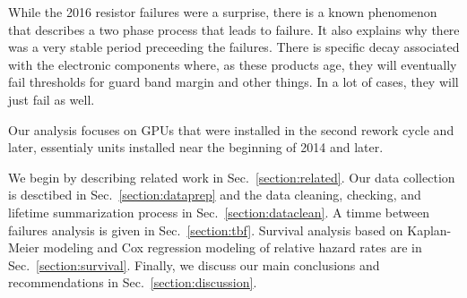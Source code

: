 While the 2016 resistor failures were a surprise, there is a known
phenomenon \cite{referenceneeded} that describes a two phase process
that leads to failure. It also explains why there was a very stable
period preceeding the failures. There is specific decay associated
with the electronic components where, as these products age, they will
eventually fail thresholds for guard band margin and other things. In
a lot of cases, they will just fail as well. 

Our analysis focuses on GPUs that were installed in the second rework
cycle and later, essentialy units installed near the beginning of 2014
and later.

We begin by describing related work in Sec.~\ref{section:related}. Our
data collection is desctibed in Sec.~\ref{section:dataprep} and the data
cleaning, checking, and lifetime summarization process in
Sec.~\ref{section:dataclean}. A timme between failures analysis is given
in Sec.~\ref{section:tbf}. Survival analysis based on Kaplan-Meier
modeling and Cox regression modeling of relative hazard rates are in
Sec.~\ref{section:survival}. Finally, we discuss our main conclusions and
recommendations in Sec.~\ref{section:discussion}.
 


